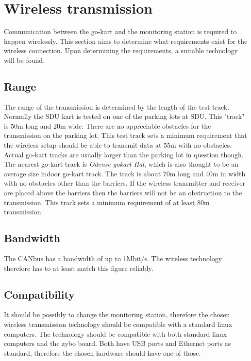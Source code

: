 
\section{Wireless transmission}\label{sec:wireless_analysis}
Communication between the go-kart and the monitoring station is required to happen wirelessly.
This section aims to determine what requirements exist for the wireless connection. 
Upon determining the requirements, a suitable technology will be found.

\subsection{Range}
The range of the transmission is determined by the length of the test track. 
Normally the SDU kart is tested on one of the parking lots at SDU.
This "track" is 50\si{\metre} long and 20\si{\metre} wide.
There are no appreciable obstacles for the transmission on the parking lot. 
This test track sets a minimum requirement that the wireless setup should be able to transmit data at 55m with no obstacles.
\\
Actual go-kart tracks are usually larger than the parking lot in question though. 
The nearest go-kart track is \textit{Odense gokart Hal}, which is also thought to be an average size indoor go-kart track.
The track is about 70m long and 40m in width with no obstacles other than the barriers. 
If the wireless transmitter and receiver are placed above the barriers then the barriers will not be an obstruction to the transmission. 
This track sets a minimum requirement of at least 80m transmission.

\subsection{Bandwidth}
The CANbus has a bandwidth of up to 1Mbit/s.
The wireless technology therefore has to at least match this figure reliably.

\subsection{Compatibility}
It should be possibly to change the monitoring station, therefore the chosen wireless transmission technology should be compatible with a standard linux computers.
The technology should be compatible with both standard linux computers and the zybo board.
Both have USB ports and Ethernet ports as standard, therefore the chosen hardware should have one of those.

